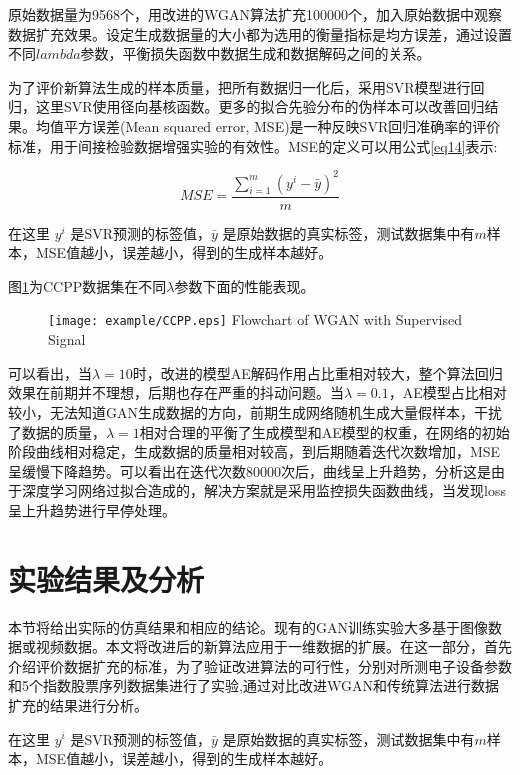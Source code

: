 原始数据量为9568个，用改进的WGAN算法扩充100000个，加入原始数据中观察数据扩充效果。设定生成数据量的大小都为选用的衡量指标是均方误差，通过设置不同$lambda$参数，平衡损失函数中数据生成和数据解码之间的关系。

为了评价新算法生成的样本质量，把所有数据归一化后，采用SVR模型进行回归，这里SVR使用径向基核函数。更多的拟合先验分布的伪样本可以改善回归结果。均值平方误差(Mean squared error, MSE)是一种反映SVR回归准确率的评价标准，用于间接检验数据增强实验的有效性。MSE的定义可以用公式\ref{eq14}表示:

\begin{equation}
\label{eq14}
MSE=\frac{\sum \limits_{i=1}^m (y^{i}-\bar{y})^{2}}{m}
\end{equation}

在这里 $y^{i}$ 是SVR预测的标签值，$\bar{y}$ 是原始数据的真实标签，测试数据集中有$m$样本，MSE值越小，误差越小，得到的生成样本越好。

图\ref{figCCPP}为CCPP数据集在不同$\lambda$参数下面的性能表现。
\begin{figure}[!htp]
	\centering
	\texttt{[image: example/CCPP.eps]}
	{Flowchart of WGAN with Supervised Signal}
	\label{figCCPP}
\end{figure}

可以看出，当$\lambda=10$时，改进的模型AE解码作用占比重相对较大，整个算法回归效果在前期并不理想，后期也存在严重的抖动问题。当$\lambda=0.1$，AE模型占比相对较小，无法知道GAN生成数据的方向，前期生成网络随机生成大量假样本，干扰了数据的质量，$\lambda=1$相对合理的平衡了生成模型和AE模型的权重，在网络的初始阶段曲线相对稳定，生成数据的质量相对较高，到后期随着迭代次数增加，MSE呈缓慢下降趋势。可以看出在迭代次数80000次后，曲线呈上升趋势，分析这是由于深度学习网络过拟合造成的，解决方案就是采用监控损失函数曲线，当发现loss呈上升趋势进行早停处理。


\section{实验结果及分析}
本节将给出实际的仿真结果和相应的结论。现有的GAN训练实验大多基于图像数据或视频数据。本文将改进后的新算法应用于一维数据的扩展。在这一部分，首先介绍评价数据扩充的标准，为了验证改进算法的可行性，分别对所测电子设备参数和5个指数股票序列数据集进行了实验,通过对比改进WGAN和传统算法进行数据扩充的结果进行分析。


在这里 $y^{i}$ 是SVR预测的标签值，$\bar{y}$ 是原始数据的真实标签，测试数据集中有$m$样本，MSE值越小，误差越小，得到的生成样本越好。

